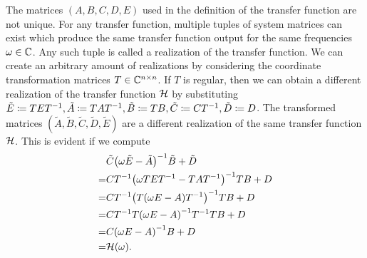 \begin{remark}
    The matrices $(A, B, C, D, E)$ used in the definition of the transfer function are not unique.
    For any transfer function, multiple tuples of system matrices can exist which produce the same transfer function output for the same frequencies $\omega \in \mathbb{C}$.
    Any such tuple is called a realization of the transfer function.
    We can create an arbitrary amount of realizations by considering the coordinate transformation matrices $T \in \mathbb{C}^{n \times n}$.
    If $T$ is regular, then we can obtain a different realization of the transfer function $\mathcal{H}$ by substituting $\tilde{E} \coloneqq T E T^{-1}, \tilde{A} \coloneqq T A T^{-1}, \tilde{B} \coloneqq T B, \tilde{C} \coloneqq C T^{-1}, \tilde{D} \coloneqq D$.
    The transformed matrices $(\tilde{A}, \tilde{B}, \tilde{C}, \tilde{D}, \tilde{E})$ are a different realization of the same transfer function $\mathcal{H}$.
    This is evident if we compute
    \begin{align*}
        &\tilde{C} {\left( \omega \tilde{E} - \tilde{A} \right)}^{-1} \tilde{B} + \tilde{D} \\
        = &C T^{-1} {\left( \omega T E T^{-1} - T A T^{-1} \right)}^{-1} T B + D \\
        = &C T^{-1} {\left( T (\omega E - A) T^{-1} \right)}^{-1} T B + D \\
        = &C T^{-1} T {\left( \omega E - A \right)}^{-1} T^{-1} T B + D \\
        = &C {(\omega E - A)}^{-1} B + D \\
        = &\mathcal{H}(\omega).
    \end{align*}
\end{remark}
%
